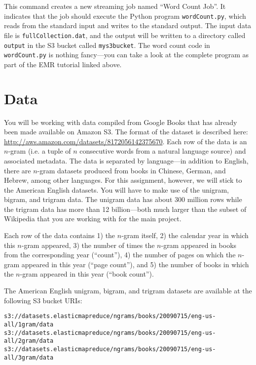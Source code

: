 \documentclass[10pt]{article}
\begin{document}
This command creates a new streaming job named ``Word Count Job''. It indicates that the
job should execute the Python program \texttt{wordCount.py}, which reads from the standard
input and writes to the standard output. The input data file is \texttt{fullCollection.dat},
and the output will be written to a directory called \texttt{output} in the S3 bucket called
\texttt{mys3bucket}. The word count code in \texttt{wordCount.py} is nothing fancy---you can
take a look at the complete program as part of the EMR tutorial linked above.


\section{Data}

You will be working with data compiled from Google Books that has already been
made available on Amazon S3. The format of the dataset is described
here: \url{http://aws.amazon.com/datasets/8172056142375670}. Each row of the
data is an $n$-gram (i.e. a tuple of $n$ consecutive words from a natural
language source) and associated metadata. The data is separated by language---in
addition to English, there are $n$-gram datasets produced from books in Chinese,
German, and Hebrew, among other languages. For this assignment, however, we will stick
to the American English datasets. You will have to make use of the unigram,
bigram, and trigram data. The unigram data has about 300 million rows while
the trigram data has more than 12 billion---both much larger than the subset
of Wikipedia that you are working with for the main project.

Each row of the data contains 1) the $n$-gram itself, 2) the calendar year in
which this $n$-gram appeared, 3) the number of times the $n$-gram appeared in
books from the corresponding year (``count''), 4) the number of pages on which the $n$-gram
appeared in this year (``page count''), and 5) the number of books in which the $n$-gram appeared
in this year (``book count'').

The American English unigram, bigram, and trigram datasets are available at
the following S3 bucket URIs:

\begin{verbatim}
s3://datasets.elasticmapreduce/ngrams/books/20090715/eng-us-all/1gram/data
s3://datasets.elasticmapreduce/ngrams/books/20090715/eng-us-all/2gram/data
s3://datasets.elasticmapreduce/ngrams/books/20090715/eng-us-all/3gram/data
\end{verbatim}
\end{document}

